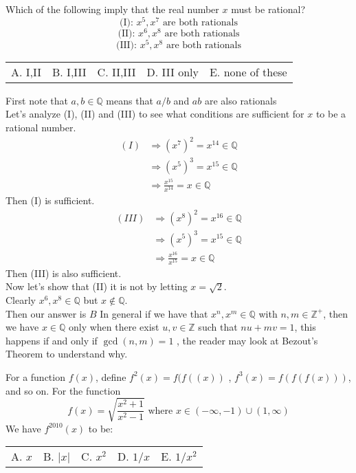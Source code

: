 \documentclass[12pt]{article}
\makeatletter
\newcounter{problem}
\newcommand{\multChoice}[5]{
    \begin{tabular}{l @{\hskip 1.5cm} l @{\hskip 1.5cm} l @{\hskip 1.5cm} l @{\hskip 1.5cm} l}
    A. #1 & B. #2 & C. #3 & D. #4 & E. #5
\end{tabular}

}
\makeatother
\begin{document}
\begin{problem}
   Which of the following imply that the real number $x$ must be rational? \hspace{2.7em} \\ 
   $$\text{(I): } x^5,x^7 \text{ are both rationals}$$
   $$\text{(II): } x^6,x^8 \text{ are both rationals}$$
   $$\text{(III): } x^5,x^8 \text{ are both rationals}$$
   \multChoice{I,II}{I,III}{II,III}{III only}{none of these}
\end{problem}

\begin{solution}[B]
   First note that $a,b \in \mathbb{Q}$ means that  $a/b$ and $ab$ are also rationals \\
    Let's analyze (I), (II) and (III) to see what conditions are sufficient for $x$ to be a rational number.
    \begin{align*}
        (I) &\Rightarrow (x^7)^2 = x^{14} \in \mathbb{Q} \\
        &\Rightarrow (x^5)^3 = x^{15} \in \mathbb{Q} \\
        &\Rightarrow \frac{x^{15}}{x^{14}} = x \in \mathbb{Q}
    \end{align*}
    Then (I) is sufficient.
    \begin{align*}
        (III) &\Rightarrow  (x^8)^2 = x^{16} \in \mathbb{Q} \\
        &\Rightarrow (x^5)^3 = x^{15} \in \mathbb{Q} \\
        &\Rightarrow \frac{x^{16}}{x^{15}} = x \in \mathbb{Q}
    \end{align*}
    Then (III) is also sufficient. \\
    Now let's show that (II) it is not by letting $x=\sqrt{2}$.\\ 
Clearly $x^6,x^8 \in \mathbb{Q}$ but $x \notin \mathbb{Q}$. \\
Then our answer is $\boxed{B}$ 
\vskip 0.2cm
In general if we have that $x^n,x^m \in \mathbb{Q}$ with $n,m \in \mathbb{Z}^{+} $, then we have $x \in \mathbb{Q}$ only when there exist $u,v \in \mathbb{Z}$ such that $nu+mv=1$, this happens if and only if $\gcd(n,m)=1$ , the reader may look at Bezout's Theorem to understand why. 
\end{solution}

\begin{problem}
   For a function $f(x)$, define $f^2(x)=f(f((x))$ , $f^3(x)=f(f(f(x)))$, and so on. For the function 
    $$f(x) = \sqrt{\frac{x^2+1}{x^2-1}} \text{ where } x \in (-\infty,-1) \cup (1,\infty) $$
    We have $f^{2010}(x)$ to be: \\
    \multChoice{$x$}{$|x|$}{$x^2$}{$1/x$}{$1/x^2$}
\end{problem}
\end{document}
